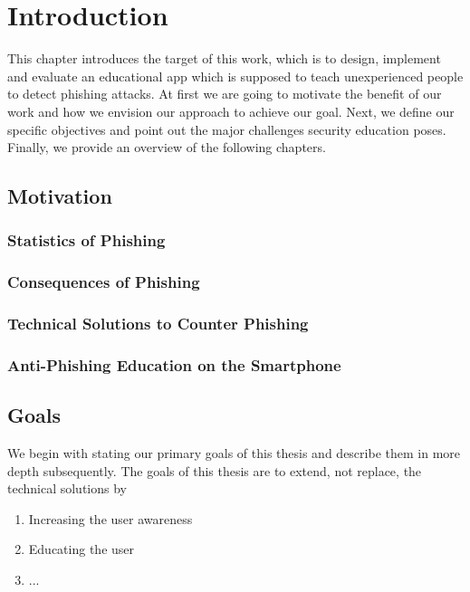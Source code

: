 \section{Introduction}
\label{s:introduction}
This chapter introduces the target of this work, which is to design, implement and evaluate an educational app which is supposed to teach unexperienced people to detect phishing attacks. At first we are going to motivate the benefit of our work and how we envision our approach to achieve our goal. Next, we define our specific objectives and point out the major challenges security education poses. Finally, we provide an overview of the following chapters.



\subsection{Motivation}

\subsubsection{Statistics of Phishing}

\subsubsection{Consequences of Phishing}

\subsubsection{Technical Solutions to Counter Phishing}

\subsubsection{Anti-Phishing Education on the Smartphone}

\subsection{Goals}
\label{s:goals}
We begin with stating our primary goals of this thesis and describe them in more depth subsequently. The goals of this thesis are to extend, not replace, the technical solutions by
\begin{enumerate}
	\item Increasing the user awareness
	\item Educating the user
	\item ...
\end{enumerate}

